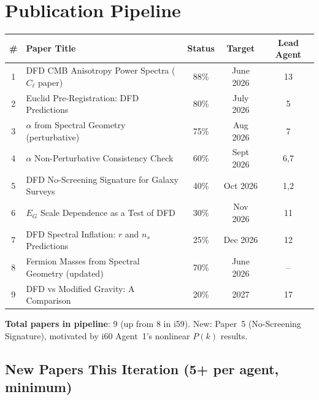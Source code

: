 \documentclass[11pt,a4paper]{article}
\begin{document}
\section{Publication Pipeline}

\begin{center}
\begin{longtable}{clccc}
\toprule
\textbf{\#} & \textbf{Paper Title} & \textbf{Status} & \textbf{Target} & \textbf{Lead Agent} \\
\midrule
1 & DFD CMB Anisotropy Power Spectra ($C_\ell$ paper) & 88\% & June 2026 & 13 \\
2 & Euclid Pre-Registration: DFD Predictions & 80\% & July 2026 & 5 \\
3 & $\alpha$ from Spectral Geometry (perturbative) & 75\% & Aug 2026 & 7 \\
4 & $\alpha$ Non-Perturbative Consistency Check & 60\% & Sept 2026 & 6,7 \\
5 & DFD No-Screening Signature for Galaxy Surveys & 40\% & Oct 2026 & 1,2 \\
6 & $E_G$ Scale Dependence as a Test of DFD & 30\% & Nov 2026 & 11 \\
7 & DFD Spectral Inflation: $r$ and $n_s$ Predictions & 25\% & Dec 2026 & 12 \\
8 & Fermion Masses from Spectral Geometry (updated) & 70\% & June 2026 & -- \\
9 & DFD vs Modified Gravity: A Comparison & 20\% & 2027 & 17 \\
\bottomrule
\end{longtable}
\end{center}

\textbf{Total papers in pipeline}: 9 (up from 8 in i59). New: Paper~5 (No-Screening Signature), motivated by i60 Agent~1's nonlinear $P(k)$ results.

\subsection{New Papers This Iteration (5+ per agent, minimum)}
\end{document}

